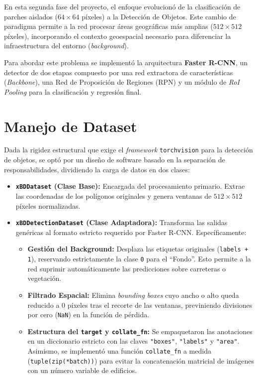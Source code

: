 \documentclass[11pt, a4paper]{article}
\begin{document}
En esta segunda fase del proyecto, el enfoque evolucionó de la clasificación de parches aislados ($64\times64$ píxeles) a la Detección de Objetos. Este cambio de paradigma permite a la red procesar áreas geográficas más amplias ($512\times512$ píxeles), incorporando el contexto geoespacial necesario para diferenciar la infraestructura del entorno (\textit{background}).

Para abordar este problema se implementó la arquitectura \textbf{Faster R-CNN}, un detector de dos etapas compuesto por una red extractora de características (\textit{Backbone}), una Red de Proposición de Regiones (RPN) y un módulo de \textit{RoI Pooling} para la clasificación y regresión final.

\section{Manejo de Dataset}

Dada la rigidez estructural que exige el \textit{framework} \texttt{torchvision} para la detección de objetos, se optó por un diseño de software basado en la separación de responsabilidades, dividiendo la carga de datos en dos clases:

\begin{itemize}
    \item \textbf{\texttt{xBDDataset} (Clase Base):} Encargada del procesamiento primario. Extrae las coordenadas de los polígonos originales y genera ventanas de $512\times512$ píxeles normalizadas.
    \item \textbf{\texttt{xBDDetectionDataset} (Clase Adaptadora):} Transforma las salidas genéricas al formato estricto requerido por Faster R-CNN. Específicamente:
    \begin{itemize}
        \item \textbf{Gestión del Background:} Desplaza las etiquetas originales (\texttt{labels + 1}), reservando estrictamente la clase \texttt{0} para el ``Fondo''. Esto permite a la red suprimir automáticamente las predicciones sobre carreteras o vegetación.
        \item \textbf{Filtrado Espacial:} Elimina \textit{bounding boxes} cuyo ancho o alto queda reducido a 0 píxeles tras el recorte de las ventanas, previniendo divisiones por cero (\texttt{NaN}) en la función de pérdida.
        \item \textbf{Estructura del \texttt{target} y \texttt{collate\_fn}:} Se empaquetaron las anotaciones en un diccionario estricto con las claves \texttt{"boxes"}, \texttt{"labels"} y \texttt{"area"}. Asimismo, se implementó una función \texttt{collate\_fn} a medida (\texttt{tuple(zip(*batch))}) para evitar la concatenación matricial de imágenes con un número variable de edificios.
    \end{itemize}
\end{itemize}
\end{document}
